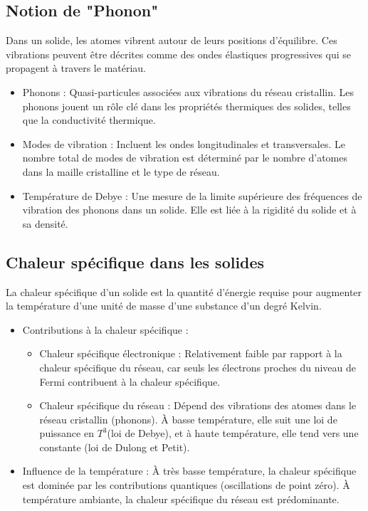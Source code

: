 \documentclass{article}
\begin{document}
    \subsection{Notion de "Phonon"}
    Dans un solide, les atomes vibrent autour de leurs positions d'équilibre. Ces vibrations peuvent être décrites comme des ondes élastiques progressives qui se propagent à travers le matériau.

    \begin{itemize}
        \item Phonons : Quasi-particules associées aux vibrations du réseau cristallin. Les phonons jouent un rôle clé dans les propriétés thermiques des solides, telles que la conductivité thermique.
        \item Modes de vibration : Incluent les ondes longitudinales et transversales. Le nombre total de modes de vibration est déterminé par le nombre d'atomes dans la maille cristalline et le type de réseau.
        \item Température de Debye : Une mesure de la limite supérieure des fréquences de vibration des phonons dans un solide. Elle est liée à la rigidité du solide et à sa densité.
    \end{itemize}
    
    \subsection{Chaleur spécifique dans les solides}
    La chaleur spécifique d'un solide est la quantité d'énergie requise pour augmenter la température d'une unité de masse d'une substance d'un degré Kelvin.

    \begin{itemize}
        \item Contributions à la chaleur spécifique :
        \begin{itemize}
            \item Chaleur spécifique électronique : Relativement faible par rapport à la chaleur spécifique du réseau, car seuls les électrons proches du niveau de Fermi contribuent à la chaleur spécifique.
            \item Chaleur spécifique du réseau : Dépend des vibrations des atomes dans le réseau cristallin (phonons). À basse température, elle suit une loi de puissance en $T^3$(loi de Debye), et à haute température, elle tend vers une constante (loi de Dulong et Petit).
        \end{itemize}
        \item Influence de la température : À très basse température, la chaleur spécifique est dominée par les contributions quantiques (oscillations de point zéro). À température ambiante, la chaleur spécifique du réseau est prédominante.
    \end{itemize}
\end{document}
